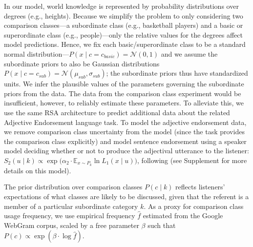 \documentclass[doc]{apa6}
\begin{document}
In our model, world knowledge is represented by probability distributions over degrees (e.g., heights).
Because we simplify the problem to only considering two comparison classes---a subordinate class (e.g., basketball players) and a basic or superordinate class (e.g., people)---only the relative values for the degrees affect model predictions. 
Hence, we fix each basic/superordinate class to be a standard normal distribution---$P(x \mid c = c_{basic}) = \mathcal{N}(0, 1)$ and we assume the subordinate priors to also be Gaussian distributions \(P(x \mid c = c_{sub}) = \mathcal{N}(\mu_{sub}, \sigma_{sub})\); the subordinate priors thus have standardized units.
We infer the plausible values of the parameters governing the subordinate priors from the data.
The data from the comparison class experiment would be insufficient, however, to reliably estimate these parameters. 
To alleviate this, we use the same RSA architecture to predict additional data about the related Adjective Endorsement language task. To model the adjective endorsement data, we remove comparison class uncertainty from the model (since the task provides the comparison class explicitly) and model sentence endorsement using a speaker model deciding whether or not to produce the adjectival utterance to the listener: $S_{2}(u \mid k) \propto \exp{(\alpha_2 \cdot {\mathbb E}_{x\sim P_{k}}} \ln{L_1(x \mid u)})$, following  (see Supplement for more details on this model). 

The prior distribution over comparison classes $P(c \mid k)$ reflects listeners' expectations of what classes are likely to be discussed, given that the referent is a member of a particular subordinate category $k$. 
As a proxy for comparison class usage frequency, we use empirical frequency \(\hat{f}\) estimated from the Google WebGram corpus, scaled by a free parameter $\beta$ such that $P(c) \propto \exp{(\beta \cdot \log \hat{f})}$.
\end{document}
